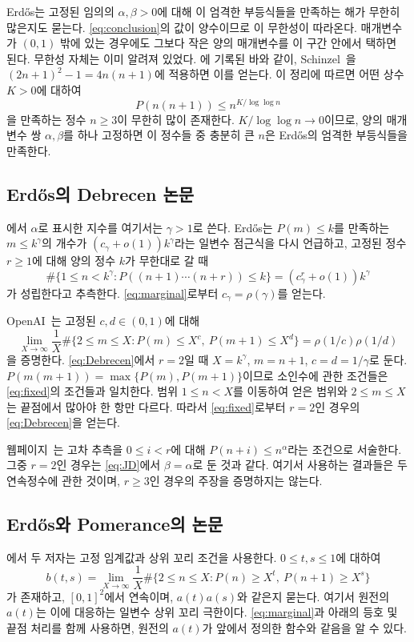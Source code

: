 \documentclass[11pt,a4paper]{amsart}
\theoremstyle{korplain}
\begin{document}
Erd\H{o}s는 고정된 임의의 $\alpha,\beta>0$에 대해 이 엄격한 부등식들을
만족하는 해가 무한히 많은지도 묻는다.
\eqref{eq:conclusion}의 값이 양수이므로 이 무한성이 따라온다.
매개변수가 $(0,1)$ 밖에 있는 경우에도 그보다 작은 양의 매개변수를
이 구간 안에서 택하면 된다.
무한성 자체는 이미 알려져 있었다. \cite{Bloom928}에 기록된 바와 같이,
Schinzel~\cite[정리~14, 231쪽]{Schinzel1967}을
$(2n+1)^2-1=4n(n+1)$에 적용하면 이를 얻는다.
이 정리에 따르면 어떤 상수 $K>0$에 대하여
\[
 P(n(n+1))\le n^{K/\log\log n}
\]
을 만족하는 정수 $n\ge3$이 무한히 많이 존재한다.
$K/\log\log n\to0$이므로, 양의 매개변수 쌍 $\alpha,\beta$를 하나 고정하면
이 정수들 중 충분히 큰 $n$은 Erd\H{o}s의 엄격한 부등식들을 만족한다.

\subsection{Erd\H{o}s의 Debrecen 논문}
\cite[272--273쪽]{Erdos1976Debrecen}에서 $\alpha$로 표시한 지수를
여기서는 $\gamma>1$로 쓴다.
Erd\H{o}s는 $P(m)\le k$를 만족하는 $m\le k^\gamma$의 개수가
$(c_\gamma+o(1))k^\gamma$라는 일변수 점근식을 다시 언급하고,
고정된 정수 $r\ge1$에 대해 양의 정수 $k$가 무한대로 갈 때
\begin{equation}\label{eq:Debrecen}
 \#\{1\le n<k^\gamma:P((n+1)\cdots(n+r))\le k\}
  =(c_\gamma^r+o(1))k^\gamma
\end{equation}
가 성립한다고 추측한다. \eqref{eq:marginal}로부터 $c_\gamma=\rho(\gamma)$를 얻는다.

OpenAI~\cite[(11.7), 80쪽]{OpenAI2026}는 고정된 $c,d\in(0,1)$에 대해
\begin{equation}\label{eq:fixed}
 \lim_{X\to\infty}\frac1X
 \#\{2\le m\le X:P(m)\le X^c,\ P(m+1)\le X^d\}
 =\rho(1/c)\rho(1/d)
\end{equation}
을 증명한다. \eqref{eq:Debrecen}에서 $r=2$일 때
$X=k^\gamma$, $m=n+1$, $c=d=1/\gamma$로 둔다.
$P(m(m+1))=\max\{P(m),P(m+1)\}$이므로 소인수에 관한 조건들은
\eqref{eq:fixed}의 조건들과 일치한다.
범위 $1\le n<X$를 이동하여 얻은 범위와 $2\le m\le X$는
끝점에서 많아야 한 항만 다르다.
따라서 \eqref{eq:fixed}로부터 $r=2$인 경우의 \eqref{eq:Debrecen}을 얻는다.

웹페이지~\cite{Bloom928}는 고차 추측을
$0\le i<r$에 대해 $P(n+i)\le n^\alpha$라는 조건으로 서술한다.
그중 $r=2$인 경우는 \eqref{eq:JD}에서 $\beta=\alpha$로 둔 것과 같다.
여기서 사용하는 결과들은 두 연속정수에 관한 것이며,
$r\ge3$인 경우의 주장을 증명하지는 않는다.

\subsection{Erd\H{o}s와 Pomerance의 논문}
\cite[311쪽]{ErdosPomerance1978}에서 두 저자는 고정 임계값과 상위 꼬리 조건을 사용한다.
$0\le t,s\le1$에 대하여
\begin{equation}\label{eq:upper}
 b(t,s)=\lim_{X\to\infty}\frac1X
 \#\{2\le n\le X:P(n)\ge X^t,\ P(n+1)\ge X^s\}
\end{equation}
가 존재하고, $[0,1]^2$에서 연속이며, $a(t)a(s)$와 같은지 묻는다.
여기서 원전의 $a(t)$는 이에 대응하는 일변수 상위 꼬리 극한이다.
\eqref{eq:marginal}과 아래의 등호 및 끝점 처리를 함께 사용하면,
원전의 $a(t)$가 앞에서 정의한 함수와 같음을 알 수 있다.
\end{document}
